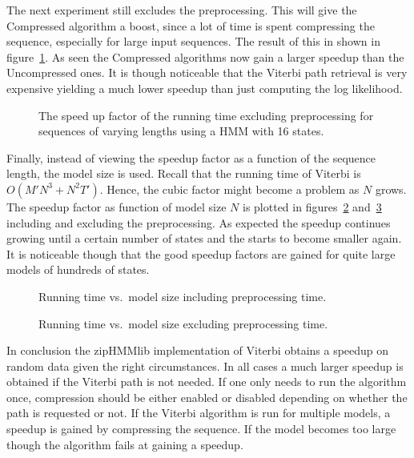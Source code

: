 The next experiment still excludes the preprocessing. This will give the
Compressed algorithm a boost, since a lot of time is spent compressing the
sequence, especially for large input sequences. The result of this in shown in
figure~\ref{fig:speedup_vs_sequence_length2}. As seen the Compressed algorithms
now gain a larger speedup than the Uncompressed ones. It is though noticeable
that the Viterbi path retrieval is very expensive yielding a much lower speedup
than just computing the log likelihood.

\begin{figure}
  \centering
  
  \caption{The speed up factor of the running time excluding preprocessing for
    sequences of varying lengths using a HMM with 16 states.}
  \label{fig:speedup_vs_sequence_length2}
\end{figure}

Finally, instead of viewing the speedup factor as a function of the sequence
length, the model size is used. Recall that the running time of Viterbi is
$O(M' N^3 + N^2 T')$. Hence, the cubic factor might become a problem as $N$
grows. The speedup factor as function of model size $N$ is plotted in
figures~\ref{fig:speedup_vs_k} and~\ref{fig:speedup_vs_k2} including and
excluding the preprocessing. As expected the speedup continues growing until a
certain number of states and the starts to become smaller again. It is
noticeable though that the good speedup factors are gained for quite large
models of hundreds of states.

\begin{figure}
  \centering
  
  \caption{Running time vs.\ model size including preprocessing time.}
  \label{fig:speedup_vs_k}
\end{figure}

\begin{figure}
  \centering
  
  \caption{Running time vs.\ model size excluding preprocessing time.}
  \label{fig:speedup_vs_k2}
\end{figure}

In conclusion the zipHMMlib implementation of Viterbi obtains a speedup on
random data given the right circumstances. In all cases a much larger speedup
is obtained if the Viterbi path is not needed. If one only needs to run the
algorithm once, compression should be either enabled or disabled depending on
whether the path is requested or not. If the Viterbi algorithm is run for
multiple models, a speedup is gained by compressing the sequence. If the model
becomes too large though the algorithm fails at gaining a speedup.

